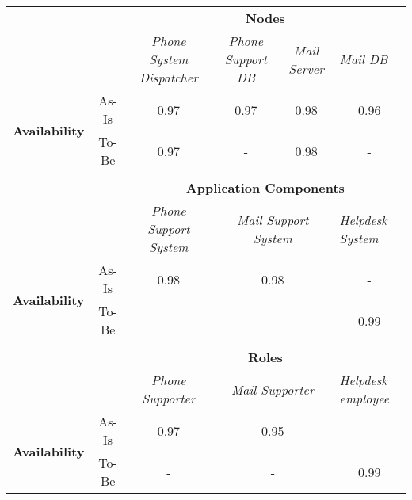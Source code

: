 \begin{table}[H]
	\centering
	\begin{tabular}{|c|c|p{2cm}|p{2.5cm}|p{2.5cm}|p{2.5cm}|}
		\cline{3-6}

		\multicolumn{2}{c}{} & \multicolumn{4}{|c|}{\textbf{Nodes}} \\ \cline{3-6}
		\multicolumn{2}{c|}{} & \multicolumn{1}{c|}{\textsl{Phone System Dispatcher}} & \multicolumn{1}{c|}{\textsl{Phone Support DB}} & \multicolumn{1}{c|}{\textsl{Mail Server}} & \multicolumn{1}{p{2cm}|}{\textsl{Mail DB}}\\
		\hline
		\multirow{2}{*}{\textbf{Availability}} & As-Is & \multicolumn{1}{c|}{0.97} & \multicolumn{1}{c|}{0.97} & \multicolumn{1}{c|}{0.98} &  \multicolumn{1}{c|}{0.96}\\ \cline{2-6}
										& To-Be &\multicolumn{1}{c|}{0.97} & \multicolumn{1}{c|}{-}& \multicolumn{1}{c|}{0.98} & \multicolumn{1}{c|}{-}\\ \hline

		\multicolumn{6}{c}{} \\ \cline{3-6}							
		\multicolumn{2}{c}{} & \multicolumn{4}{|c|}{\textbf{Application Components}} \\ \cline{3-6}
		\multicolumn{2}{c|}{} & \multicolumn{1}{c|}{\textsl{Phone Support System}} & \multicolumn{2}{c|}{\textsl{Mail Support System}} & \multicolumn{1}{p{2cm}|}{\textsl{Helpdesk System}}\\
		\hline
		\multirow{2}{*}{\textbf{Availability}} & As-Is & \multicolumn{1}{c|}{0.98} & \multicolumn{2}{c|}{0.98} & \multicolumn{1}{c|}{-}\\ \cline{2-6}
										& To-Be &\multicolumn{1}{c|}{-} & \multicolumn{2}{c|}{-} & \multicolumn{1}{c|}{0.99}\\ \hline

	   \multicolumn{6}{c}{} \\ \cline{3-6}
		\multicolumn{2}{c}{} & \multicolumn{4}{|c|}{\textbf{Roles}} \\ \cline{3-6}
		\multicolumn{2}{c|}{} & \multicolumn{1}{|c|}{\textsl{Phone Supporter}} & \multicolumn{2}{|c|}{\textsl{Mail Supporter}}& \multicolumn{1}{|p{2cm}|}{\textsl{Helpdesk employee}}\\ \hline
		\multirow{2}{*}{\textbf{Availability}} & As-Is & \multicolumn{1}{|c|}{0.97}& \multicolumn{2}{|c|}{0.95}& \multicolumn{1}{|c|}{-}\\ \cline{2-6}
		& To-Be & \multicolumn{1}{|c|}{-}  & \multicolumn{2}{|c|}{-} & \multicolumn{1}{|c|}{0.99}\\ \hline


\end{tabular}
\end{table}
